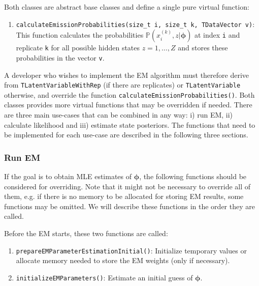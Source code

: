 \documentclass[a4paper,11pt]{article}
\def\bphi{\boldsymbol{\phi}}
\def\p{\mathbb{P}}
\newcommand{\class}[1]{\texttt{#1}}
\newcommand{\func}[1]{\texttt{#1}}
\newcommand{\pubfunc}[1]{\texttt{#1()}}
\newcommand{\variable}[1]{\texttt{#1}}
\begin{document}
Both classes are abstract base classes and define a single pure virtual function:

\begin{enumerate}
 \item \func{calculateEmissionProbabilities(size\_t i, size\_t k, TDataVector v)}: This function calculates the probabilities $\p(x_i^{(k)}, z | \bphi)$ at index \variable{i} and replicate \variable{k} for all possible hidden states $z = 1, \ldots, Z$ and stores these probabilities in the vector \variable{v}.
\end{enumerate}

A developer who wishes to implement the EM algorithm must therefore derive from \class{TLatentVariableWithRep} (if there are replicates) or \class{TLatentVariable} otherwise, and override the function \pubfunc{calculateEmissionProbabilities}. Both classes provides more virtual functions that may be overridden if needed. There are three main use-cases that can be combined in any way: i) run EM, ii) calculate likelihood and iii) estimate state posteriors. The functions that need to be implemented for each use-case are described in the following three sections.

\subsubsection{Run EM}
If the goal is to obtain MLE estimates of $\bphi$, the following functions should be considered for overriding. Note that it might not be necessary to override all of them, e.g. if there is no memory to be allocated for storing EM results, some functions may be omitted. We will describe these functions in the order they are called.

Before the EM starts, these two functions are called:
\begin{enumerate}
 \item \pubfunc{prepareEMParameterEstimationInitial}: Initialize temporary values or allocate memory needed to store the EM weights (only if necessary).
 \item \pubfunc{initializeEMParameters}: Estimate an initial guess of $\bphi$.
\end{enumerate}
\end{document}
